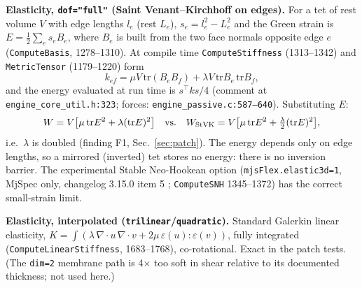 \documentclass[10pt,twocolumn]{article}
\newcommand{\code}[1]{\texttt{\small #1}}
\newcommand{\src}[1]{\texttt{\footnotesize #1}}
\begin{document}
\textbf{Elasticity, \code{dof="full"} (Saint Venant--Kirchhoff on edges).} For a tet of rest volume $V$ with edge
lengths $l_e$ (rest $L_e$), $s_e=l_e^2-L_e^2$ and the Green strain is $E=\tfrac12\sum_e s_eB_e$, where $B_e$ is built
from the two face normals opposite edge $e$ (\code{ComputeBasis}, 1278--1310). At compile time
\code{ComputeStiffness} (1313--1342) and \code{MetricTensor} (1179--1220) form
\begin{equation}
k_{ef}= \mu V\,\mathrm{tr}(B_eB_f) + \lambda V\,\mathrm{tr}B_e\,\mathrm{tr}B_f ,
\end{equation}
and the energy evaluated at run time is $s^{\top}ks/4$ (comment at \src{engine\_core\_util.h:323}; forces:
\src{engine\_passive.c:587--640}). Substituting $E$:
\begin{equation}
W = V\big[\mu\,\mathrm{tr}E^2 + \lambda(\mathrm{tr}E)^2\big]\quad\text{vs.}\quad
W_{\rm StVK}=V\big[\mu\,\mathrm{tr}E^2 + \tfrac{\lambda}{2}(\mathrm{tr}E)^2\big],
\label{eq:W}
\end{equation}
i.e.\ $\lambda$ is doubled (finding F1, Sec.~\ref{sec:patch}). The energy depends only on edge lengths, so a mirrored
(inverted) tet stores no energy: there is no inversion barrier. The experimental Stable Neo-Hookean option
(\code{mjsFlex.elastic3d=1}, MjSpec only, changelog 3.15.0 item 5 \cite{mjchg}; \code{ComputeSNH} 1345--1372) has the
correct small-strain limit.

\textbf{Elasticity, interpolated (\code{trilinear}/\code{quadratic}).} Standard Galerkin linear elasticity,
$K=\int(\lambda\,\nabla\!\cdot u\,\nabla\!\cdot v+2\mu\,\varepsilon(u)\!:\!\varepsilon(v))$, fully integrated
(\code{ComputeLinearStiffness}, 1683--1768), co-rotational. Exact in the patch tests. (The \code{dim=2} membrane
path is 4$\times$ too soft in shear relative to its documented thickness; not used here.)
\end{document}

